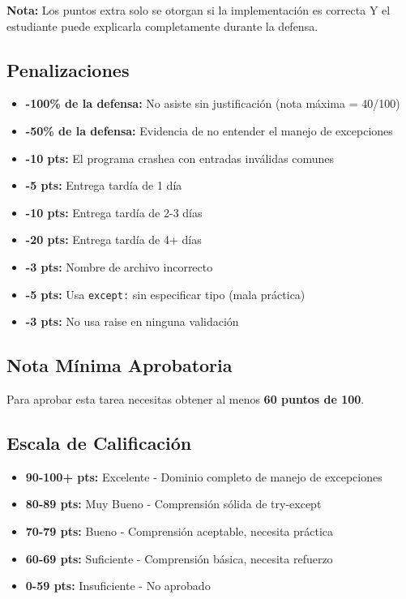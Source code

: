 \documentclass[12pt,a4paper]{article}
\begin{document}
\textbf{Nota:} Los puntos extra solo se otorgan si la implementación es correcta Y el estudiante puede explicarla completamente durante la defensa.

\subsection{Penalizaciones}

\begin{itemize}[leftmargin=*]
    \item \textbf{-100\% de la defensa:} No asiste sin justificación (nota máxima = 40/100)
    \item \textbf{-50\% de la defensa:} Evidencia de no entender el manejo de excepciones
    \item \textbf{-10 pts:} El programa crashea con entradas inválidas comunes
    \item \textbf{-5 pts:} Entrega tardía de 1 día
    \item \textbf{-10 pts:} Entrega tardía de 2-3 días
    \item \textbf{-20 pts:} Entrega tardía de 4+ días
    \item \textbf{-3 pts:} Nombre de archivo incorrecto
    \item \textbf{-5 pts:} Usa \texttt{except:} sin especificar tipo (mala práctica)
    \item \textbf{-3 pts:} No usa raise en ninguna validación
\end{itemize}

\subsection{Nota Mínima Aprobatoria}

Para aprobar esta tarea necesitas obtener al menos \textbf{60 puntos de 100}.

\subsection{Escala de Calificación}

\begin{itemize}
    \item \textbf{90-100+ pts:} Excelente - Dominio completo de manejo de excepciones
    \item \textbf{80-89 pts:} Muy Bueno - Comprensión sólida de try-except
    \item \textbf{70-79 pts:} Bueno - Comprensión aceptable, necesita práctica
    \item \textbf{60-69 pts:} Suficiente - Comprensión básica, necesita refuerzo
    \item \textbf{0-59 pts:} Insuficiente - No aprobado
\end{itemize}
\end{document}
